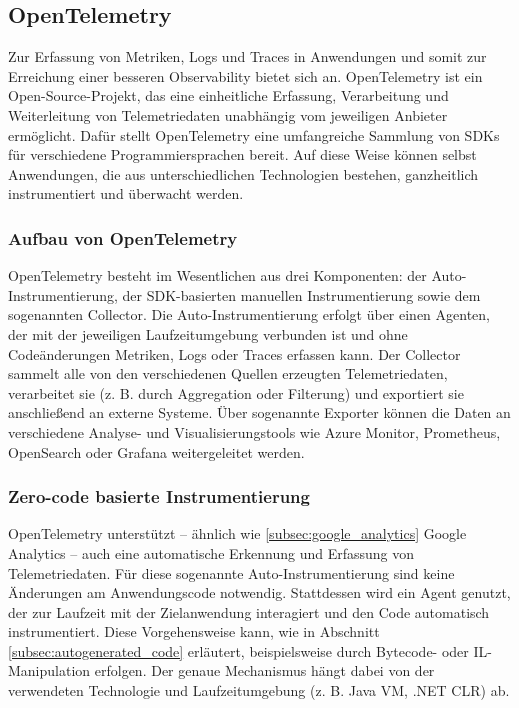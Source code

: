 \subsection{OpenTelemetry}
\label{subsec:open_telemetry}
Zur Erfassung von Metriken, Logs und Traces in Anwendungen und somit zur Erreichung einer besseren Observability bietet sich \cite[OpenTelemetry]{opentelemetry_what_is} an. OpenTelemetry ist ein Open-Source-Projekt, das eine einheitliche Erfassung, Verarbeitung und Weiterleitung von Telemetriedaten unabhängig vom jeweiligen Anbieter ermöglicht. Dafür stellt OpenTelemetry eine umfangreiche Sammlung von SDKs für verschiedene Programmiersprachen bereit. Auf diese Weise können selbst Anwendungen, die aus unterschiedlichen Technologien bestehen, ganzheitlich instrumentiert und überwacht werden.

\subsubsection{Aufbau von OpenTelemetry}
OpenTelemetry besteht im Wesentlichen aus drei Komponenten: der Auto-Instrumentierung, der SDK-basierten manuellen Instrumentierung sowie dem sogenannten Collector.  
Die Auto-Instrumentierung erfolgt über einen Agenten, der mit der jeweiligen Laufzeitumgebung verbunden ist und ohne Codeänderungen Metriken, Logs oder Traces erfassen kann.  
Der Collector sammelt alle von den verschiedenen Quellen erzeugten Telemetriedaten, verarbeitet sie (z. B. durch Aggregation oder Filterung) und exportiert sie anschließend an externe Systeme. Über sogenannte Exporter können die Daten an verschiedene Analyse- und Visualisierungstools wie Azure Monitor, Prometheus, OpenSearch oder Grafana weitergeleitet werden.

\subsubsection{Zero-code basierte Instrumentierung}
OpenTelemetry unterstützt – ähnlich wie \ref{subsec:google_analytics} Google Analytics – auch eine automatische Erkennung und Erfassung von Telemetriedaten. Für diese sogenannte {Auto-Instrumentierung} sind keine Änderungen am Anwendungscode notwendig. Stattdessen wird ein Agent genutzt, der zur Laufzeit mit der Zielanwendung interagiert und den Code automatisch instrumentiert. Diese Vorgehensweise kann, wie in Abschnitt \ref{subsec:autogenerated_code} erläutert, beispielsweise durch Bytecode- oder IL-Manipulation erfolgen. Der genaue Mechanismus hängt dabei von der verwendeten Technologie und Laufzeitumgebung (z. B. Java VM, .NET CLR) ab.

